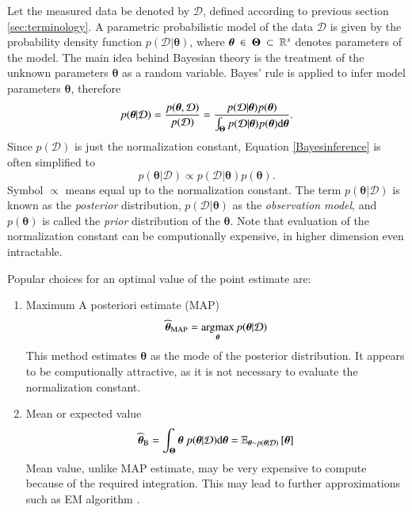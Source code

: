  Let the measured data be denoted by $\mathcal{D}$, defined according to previous section \ref{sec:terminology}. A parametric probabilistic model of the data $\mathcal{D}$ is given by the probability density function  $p(\mathcal{D}|\boldsymbol{\theta})$, where $\boldsymbol{\theta}~\in~\boldsymbol{\Theta}~\subset~\mathbb{R}^s$ denotes parameters of the model. The main idea behind Bayesian theory is the treatment of the unknown parameters $\boldsymbol{\theta}$ as a random variable.  Bayes' rule is applied to infer model parameters $\boldsymbol{\theta}$, therefore
 \begin{equation}\label{Bayesinference}
 	p(\boldsymbol{\theta} | \mathcal{D}) = \frac{p(\boldsymbol{\theta}, \mathcal{D})}{p(\mathcal{D})} = \frac{p(\mathcal{D}| \boldsymbol{\theta})p(\boldsymbol{\theta})}{\int_{\boldsymbol{\Theta}}p(\mathcal{D}|\boldsymbol{\theta})p(\boldsymbol{\theta})\mathrm{d}\boldsymbol{\theta}}.
 \end{equation} 
Since $p(\mathcal{D})$ is just the normalization constant, Equation \eqref{Bayesinference} is often simplified to
\begin{equation}
	p(\boldsymbol{\theta} | \mathcal{D}) \propto p(\mathcal{D}| \boldsymbol{\theta})p(\boldsymbol{\theta}).
\end{equation} 
Symbol $\propto$ means equal up to the normalization constant. The term $p(\boldsymbol{\theta} | \mathcal{D})$ is known as the \emph{posterior} distribution, $p(\mathcal{D}| \boldsymbol{\theta})$  as the \emph{observation model}, and $p(\boldsymbol{\theta})$ is called the \emph{prior} distribution of the $\boldsymbol{\theta}$. Note that evaluation of the normalization constant can be computionally expensive, in higher dimension even intractable. 

Popular choices for an optimal value of the point estimate are:
\begin{enumerate}
	\item Maximum A posteriori estimate (MAP)
	\begin{equation}
		\widehat{\boldsymbol{\theta}}_{\mathrm{MAP}} = \mathop{\mathrm{argmax}}_{\boldsymbol{\theta}} p(\boldsymbol{\theta} | \mathcal{D})
	\end{equation}
This method estimates $\boldsymbol{\theta}$ as the mode of the posterior distribution. It appears to be computionally attractive, as it is not necessary to evaluate the normalization constant. 
\item Mean or expected value
\begin{equation}
	\widehat{\boldsymbol{\theta}}_{\mathrm{B}} = \int_{\boldsymbol{\Theta}} \boldsymbol{\theta}~ p(\boldsymbol{\theta} | \mathcal{D}) \mathrm{d}\boldsymbol{\theta} = \mathbb{E}_{\boldsymbol{\theta} \sim p(\boldsymbol{\theta} | \mathcal{D}) }\left[\boldsymbol{\theta} \right]
\end{equation}
Mean value, unlike MAP estimate, may be very expensive to compute because of the required integration. This may lead to further approximations such as EM algorithm \cite{EM}.
\end{enumerate}	

